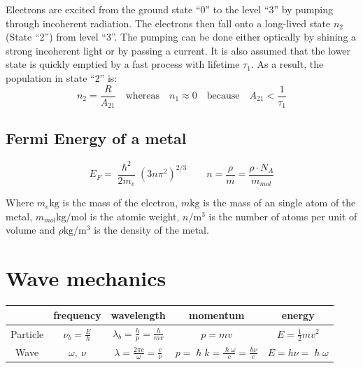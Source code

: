 \documentclass[a4paper, 9pt]{extarticle}
\begin{document}
\begin{twocolumn}
Electrons are excited from the ground state ``0'' to the level ``3'' by pumping through incoherent radiation. 
The electrons then fall onto a long-lived state $n_2$ (State ``2'') from level ``3''. 
The pumping can be done either optically by shining a strong incoherent light or by passing a current. 
It is also assumed that the lower state is quickly emptied by a fast process with lifetime $\tau_1$. 
As a result, the population in state ``2'' is:
$$n_2 = \frac{R}{A_{21}} \quad \text{whereas} \quad n_1 \approx 0 \quad \text{because} \quad  A_{21} < \frac{1}{\tau_1}$$

\subsection{Fermi Energy of a metal}

$$E_F = \frac{\hslash^2}{2m_e} \left( 3 n \pi^2 \right)^{2/3} \qquad n = \frac{\rho}{m} = \frac{\rho \cdot N_A}{m_{mol}}$$

Where $m_e \si{\kilogram}$ is the mass of the electron, $m \si{\kilogram}$ is the mass of an single atom of the metal, $m_{mol} \si{\kilogram \per \mole}$ is the atomic weight, $n \si{\per \meter \cubed}$ is the number of atoms per unit of volume and $\rho \si{\kilogram \per \metre \cubed}$ is the density of the metal. 

\section{Wave mechanics}

\begin{center}
	\begin{tabular}{ccccc}
		& frequency & wavelength & momentum & energy \\
		\midrule
		Particle & $\nu_b = \frac{E}{h}$ & $\lambda_b = \frac{h}{p} = \frac{h}{mv}$ & $p = m v$ & $E = \frac{1}{2} m v^2$ \\
		Wave & $\omega, \ \nu$ & $\lambda = \frac{2\pi c}{\omega} = \frac{c}{\nu}$ & $p =\hslash k = \frac{\hslash \omega}{c} = \frac{h \nu}{c}$ & $E = h \nu = \hslash \omega$ \\
	\end{tabular}
\end{center}


\end{twocolumn}
\end{document}
